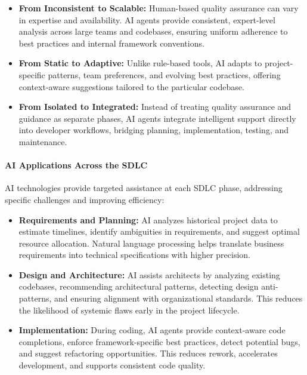 \begin{spacing}{1.2}
\begin{itemize}
    \item \textbf{From Inconsistent to Scalable:} Human-based quality assurance can vary in expertise and availability. AI agents provide consistent, expert-level analysis across large teams and codebases, ensuring uniform adherence to best practices and internal framework conventions.
    
    \item \textbf{From Static to Adaptive:} Unlike rule-based tools, AI adapts to project-specific patterns, team preferences, and evolving best practices, offering context-aware suggestions tailored to the particular codebase.
    
    \item \textbf{From Isolated to Integrated:} Instead of treating quality assurance and guidance as separate phases, AI agents integrate intelligent support directly into developer workflows, bridging planning, implementation, testing, and maintenance.
\end{itemize}

\paragraph{AI Applications Across the SDLC}
AI technologies provide targeted assistance at each SDLC phase, addressing specific challenges and improving efficiency:

\begin{itemize}
    \item \textbf{Requirements and Planning:} AI analyzes historical project data to estimate timelines, identify ambiguities in requirements, and suggest optimal resource allocation. Natural language processing helps translate business requirements into technical specifications with higher precision.
    
    \item \textbf{Design and Architecture:} AI assists architects by analyzing existing codebases, recommending architectural patterns, detecting design anti-patterns, and ensuring alignment with organizational standards. This reduces the likelihood of systemic flaws early in the project lifecycle.
    
    \item \textbf{Implementation:} During coding, AI agents provide context-aware code completions, enforce framework-specific best practices, detect potential bugs, and suggest refactoring opportunities. This reduces rework, accelerates development, and supports consistent code quality.
    

\end{itemize}
\end{spacing}
